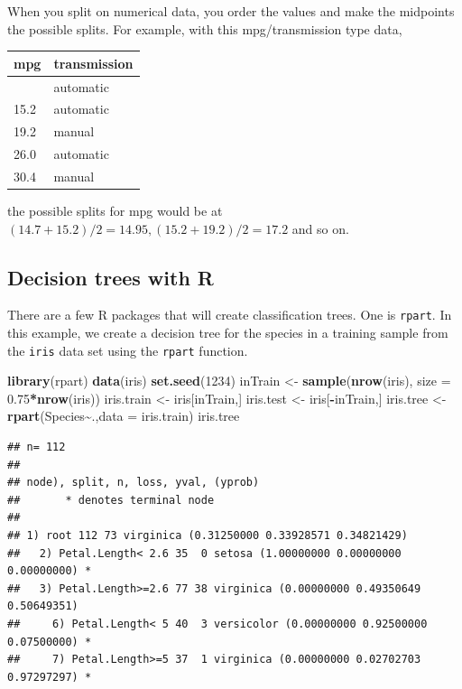 \documentclass[
]{book}
\newenvironment{Shaded}{\begin{snugshade}}{\end{snugshade}}
\newcommand{\AttributeTok}[1]{\textcolor[rgb]{0.13,0.29,0.53}{#1}}
\newcommand{\DecValTok}[1]{\textcolor[rgb]{0.00,0.00,0.81}{#1}}
\newcommand{\FloatTok}[1]{\textcolor[rgb]{0.00,0.00,0.81}{#1}}
\newcommand{\FunctionTok}[1]{\textcolor[rgb]{0.13,0.29,0.53}{\textbf{#1}}}
\newcommand{\NormalTok}[1]{#1}
\newcommand{\OtherTok}[1]{\textcolor[rgb]{0.56,0.35,0.01}{#1}}
\newcommand{\SpecialCharTok}[1]{\textcolor[rgb]{0.81,0.36,0.00}{\textbf{#1}}}
\theoremstyle{definition}
\theoremstyle{definition}
\theoremstyle{definition}
\theoremstyle{definition}
\theoremstyle{remark}
\begin{document}
When you split on numerical data, you order the values and make the midpoints the possible splits. For example, with this mpg/transmission type data,

\begin{longtable}[]{@{}ll@{}}
\toprule\noalign{}
mpg & transmission \\
\midrule\noalign{}
\endhead
\bottomrule\noalign{}
\endlastfoot
14.7 & automatic \\
15.2 & automatic \\
19.2 & manual \\
26.0 & automatic \\
30.4 & manual \\
\end{longtable}

the possible splits for mpg would be at \((14.7+15.2)/2=14.95,(15.2+19.2)/2=17.2\) and so on.

\subsection*{Decision trees with R}\label{decision-trees-with-r}

There are a few R packages that will create classification trees. One is \texttt{rpart}. In this example, we create a decision tree for the species in a training sample from the \texttt{iris} data set using the \texttt{rpart} function.

\begin{Shaded}
\begin{Highlighting}[]
\FunctionTok{library}\NormalTok{(rpart)}
\FunctionTok{data}\NormalTok{(iris)}
\FunctionTok{set.seed}\NormalTok{(}\DecValTok{1234}\NormalTok{)}
\NormalTok{inTrain }\OtherTok{\textless{}{-}} \FunctionTok{sample}\NormalTok{(}\FunctionTok{nrow}\NormalTok{(iris), }\AttributeTok{size =} \FloatTok{0.75}\SpecialCharTok{*}\FunctionTok{nrow}\NormalTok{(iris))}
\NormalTok{iris.train }\OtherTok{\textless{}{-}}\NormalTok{ iris[inTrain,]}
\NormalTok{iris.test }\OtherTok{\textless{}{-}}\NormalTok{ iris[}\SpecialCharTok{{-}}\NormalTok{inTrain,]}
\NormalTok{iris.tree }\OtherTok{\textless{}{-}} \FunctionTok{rpart}\NormalTok{(Species}\SpecialCharTok{\textasciitilde{}}\NormalTok{.,}\AttributeTok{data =}\NormalTok{ iris.train)}
\NormalTok{iris.tree}
\end{Highlighting}
\end{Shaded}

\begin{verbatim}
## n= 112 
## 
## node), split, n, loss, yval, (yprob)
##       * denotes terminal node
## 
## 1) root 112 73 virginica (0.31250000 0.33928571 0.34821429)  
##   2) Petal.Length< 2.6 35  0 setosa (1.00000000 0.00000000 0.00000000) *
##   3) Petal.Length>=2.6 77 38 virginica (0.00000000 0.49350649 0.50649351)  
##     6) Petal.Length< 5 40  3 versicolor (0.00000000 0.92500000 0.07500000) *
##     7) Petal.Length>=5 37  1 virginica (0.00000000 0.02702703 0.97297297) *
\end{verbatim}
\end{document}
